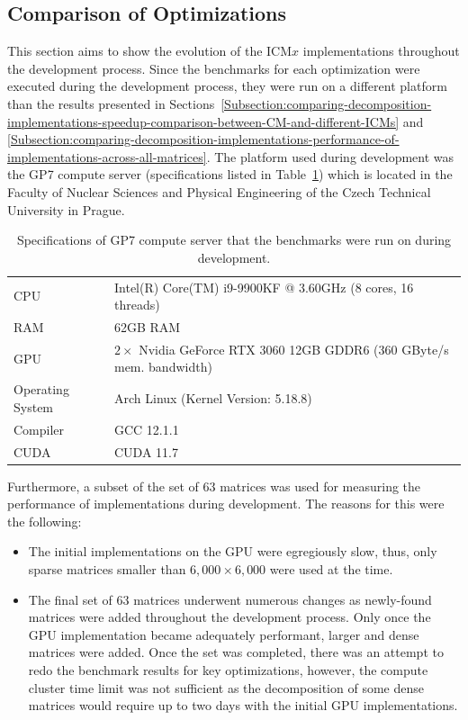 \subsection{Comparison of Optimizations}
This section aims to show the evolution of the ICM$ x $ implementations throughout the development process. Since the benchmarks for each optimization were executed during the development process, they were run on a different platform than the results presented in Sections~\ref{Subsection:comparing-decomposition-implementations-speedup-comparison-between-CM-and-different-ICMs} and \ref{Subsection:comparing-decomposition-implementations-performance-of-implementations-across-all-matrices}. The platform used during development was the GP7 compute server (specifications listed in Table~\ref{Table:comparing-decomposition-implementations-comparison-of-optimizations}) which is located in the Faculty of Nuclear Sciences and Physical Engineering of the Czech Technical University in Prague.

\begin{table}[ht!]
	\centering
	\begin{tabular}{|l|l|}
		\hline
		CPU              & Intel(R) Core(TM) i9-9900KF @ 3.60GHz (8 cores, 16 threads) \\
		RAM              & 62GB RAM \\
		GPU              & $ 2\times $ Nvidia GeForce RTX 3060 12GB GDDR6 (360 GByte/s mem. bandwidth) \\
		Operating System & Arch Linux (Kernel Version: 5.18.8) \\
		Compiler         & GCC 12.1.1 \\
		CUDA             & CUDA 11.7 \\ \hline
	\end{tabular}
	\caption{Specifications of GP7 compute server that the benchmarks were run on during development.}
	\label{Table:comparing-decomposition-implementations-comparison-of-optimizations}
\end{table}

Furthermore, a subset of the set of 63 matrices was used for measuring the performance of implementations during development. The reasons for this were the following:

\begin{itemize}
	\item The initial implementations on the GPU were egregiously slow, thus, only sparse matrices smaller than $ 6,000\times 6,000 $ were used at the time.
	\item The final set of 63 matrices underwent numerous changes as newly-found matrices were added throughout the development process. Only once the GPU implementation became adequately performant, larger and dense matrices were added. Once the set was completed, there was an attempt to redo the benchmark results for key optimizations, however, the compute cluster time limit was not sufficient as the decomposition of some dense matrices would require up to two days with the initial GPU implementations.
\end{itemize}

